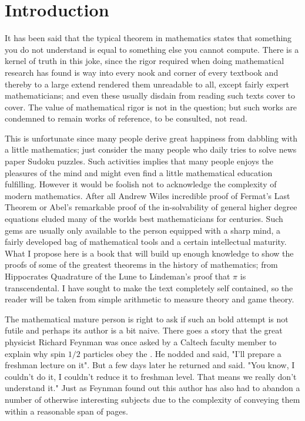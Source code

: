 \chapter{Introduction}
It has been said that the typical theorem in mathematics states that something you do not understand is equal to something else you cannot compute. There is a kernel of truth in this joke, since the rigor required when doing mathematical research has found is way into every nook and corner of every textbook and thereby to a large extend rendered them unreadable to all, except fairly expert mathematicians; and even these usually disdain from reading such texts cover to cover. The value of mathematical rigor is not in the question; but such works are condemned to remain works of reference, to be consulted, not read.

This is unfortunate since many people derive great happiness from dabbling with a little mathematics; just consider the many people who daily tries to solve news paper Sudoku puzzles. Such activities implies that many people enjoys the pleasures of the mind and might even find a little mathematical education fulfilling. However it would be foolish not to acknowledge the complexity of modern mathematics. After all Andrew Wiles incredible proof of Fermat's Last Theorem or Abel's remarkable proof of the in-solvability of general higher degree equations eluded many of the worlds best mathematicians for centuries. Such gems are usually only available to the person equipped with a sharp mind, a fairly developed bag of mathematical tools and a certain intellectual maturity. What I propose here is a book that will build up enough knowledge to show the proofs of some of the greatest theorems in the history of mathematics; from Hippocrates Quadrature of the Lune to Lindeman's proof that $\pi$ is transcendental. I have sought to make the text completely self contained, so the reader will be taken from simple arithmetic to measure theory and game theory.

The mathematical mature person is right to ask if such an bold attempt is not futile and perhaps its author is a bit naive. There goes a story that the great physicist Richard Feynman was once asked by a Caltech faculty member to explain why spin $1/2$ particles obey the . He nodded and said, "I'll prepare a freshman lecture on it". But a few days later he returned and said. "You know, I couldn't do it, I couldn't reduce it to freshman level. That means we really don't understand it." Just as Feynman found out this author has also had to abandon a number of otherwise interesting subjects due to the complexity of conveying them within a reasonable span of pages.


